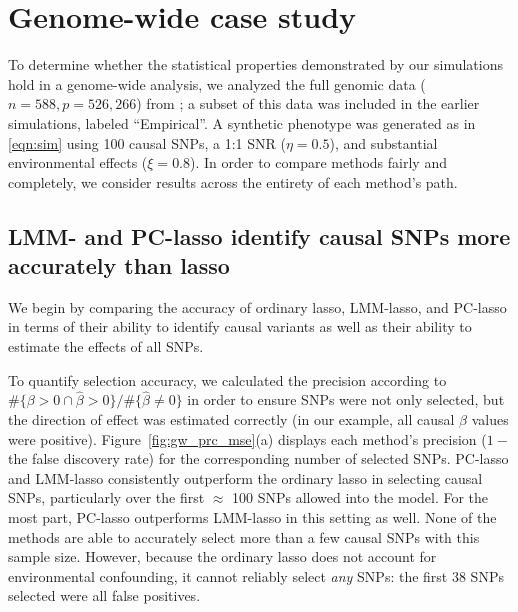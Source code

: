 \section{Genome-wide case study} \label{sec:gw_cs}

To determine whether the statistical properties demonstrated by our simulations hold in a genome-wide analysis, we analyzed the full genomic data ($n=588, p=526,266$) from \citet{larkin2015objectives}; a subset of this data was included in the earlier simulations, labeled ``Empirical''.  A synthetic phenotype was generated as in \eqref{eqn:sim} using 100 causal SNPs, a 1:1 SNR ($\eta = 0.5$), and substantial environmental effects ($\xi = 0.8$). In order to compare methods fairly and completely, we consider results across the entirety of each method's path.

\subsection{LMM- and PC-lasso identify causal SNPs more accurately than lasso}

We begin by comparing the accuracy of ordinary lasso, LMM-lasso, and PC-lasso in terms of their ability to identify causal variants as well as their ability to estimate the effects of all SNPs.

To quantify selection accuracy, we calculated the precision according to $\#\{ \beta > 0 \cap \widehat{\beta} > 0  \}/\#\{ \widehat{\beta} \ne 0 \}$ in order to ensure SNPs were not only selected, but the direction of effect was estimated correctly (in our example, all causal $\beta$ values were positive). Figure~\ref{fig:gw_prc_mse}(a) displays each method's precision ($1 -$ the false discovery rate) for the corresponding number of selected SNPs. PC-lasso and LMM-lasso consistently outperform the ordinary lasso in selecting causal SNPs, particularly over the first $\approx$ 100 SNPs allowed into the model. For the most part, PC-lasso outperforms LMM-lasso in this setting as well. None of the methods are able to accurately select more than a few causal SNPs with this sample size.  However, because the ordinary lasso does not account for environmental confounding, it cannot reliably select \emph{any} SNPs: the first 38 SNPs selected were all false positives.

